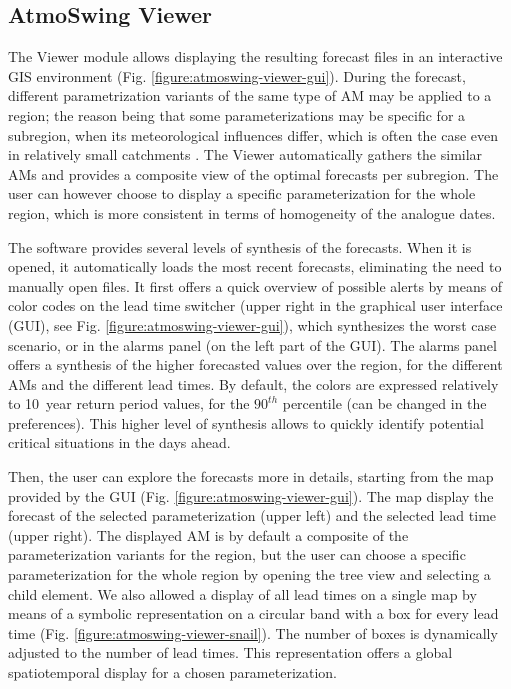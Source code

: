 \documentclass[review]{elsarticle}
\begin{document}
\subsection{AtmoSwing Viewer}
\label{sec:viewer}

The Viewer module allows displaying the resulting forecast files in an interactive GIS environment (Fig. \ref{figure:atmoswing-viewer-gui}). During the forecast, different parametrization variants of the same type of AM may be applied to a region; the reason being that some parameterizations may be specific for a subregion, when its meteorological influences differ, which is often the case even in relatively small catchments \citep{Horton2012}. The Viewer automatically gathers the similar AMs and provides a composite view of the optimal forecasts per subregion. The user can however choose to display a specific parameterization for the whole region, which is more consistent in terms of homogeneity of the analogue dates.

The software provides several levels of synthesis of the forecasts. When it is opened, it automatically loads the most recent forecasts, eliminating the need to manually open files. It first offers a quick overview of possible alerts by means of color codes on the lead time switcher (upper right in the graphical user interface (GUI), see Fig. \ref{figure:atmoswing-viewer-gui}), which synthesizes the worst case scenario, or in the alarms panel (on the left part of the GUI). The alarms panel offers a synthesis of the higher forecasted values over the region, for the different AMs and the different lead times. By default, the colors are expressed relatively to 10~year return period values, for the $90^{th}$ percentile (can be changed in the preferences). This higher level of synthesis allows to quickly identify potential critical situations in the days ahead.

Then, the user can explore the forecasts more in details, starting from the map provided by the GUI (Fig. \ref{figure:atmoswing-viewer-gui}). The map display the forecast of the selected parameterization (upper left) and the selected lead time (upper right). The displayed AM is by default a composite of the parameterization variants for the region, but the user can choose a specific parameterization for the whole region by opening the tree view and selecting a child element. We also allowed a display of all lead times on a single map by means of a symbolic representation on a circular band with a box for every lead time (Fig. \ref{figure:atmoswing-viewer-snail}). The number of boxes is dynamically adjusted to the number of lead times. This representation offers a global spatiotemporal display for a chosen parameterization.
\end{document}
